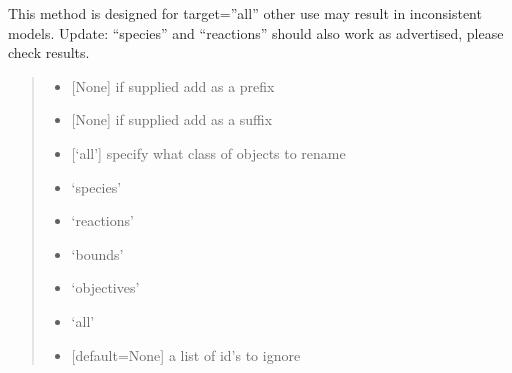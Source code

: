 \documentclass[letterpaper,10pt,english]{sphinxmanual}
\begin{document}
\begin{fulllineitems}
\begin{fulllineitems}
\label{\detokenize{modules_doc:cbmpy.CBModel.Model.renameObjectIds}}
\pysigstartsignatures
{}
\pysigstopsignatures
\sphinxAtStartPar
This method is designed for target=”all” other use may result in inconsistent models. Update: “species” and “reactions”
should also work as advertised, please check results.
\begin{quote}
\begin{itemize}
\item {} 
\sphinxAtStartPar
{} {[}None{]} if supplied add as a prefix

\item {} 
\sphinxAtStartPar
{} {[}None{]} if supplied add as a suffix

\item {} 
\sphinxAtStartPar
{} {[}‘all’{]} specify what class of objects to rename

\end{itemize}
\begin{itemize}
\item {} 
\sphinxAtStartPar
‘species’

\item {} 
\sphinxAtStartPar
‘reactions’

\item {} 
\sphinxAtStartPar
‘bounds’

\item {} 
\sphinxAtStartPar
‘objectives’

\item {} 
\sphinxAtStartPar
‘all’

\end{itemize}
\begin{itemize}
\item {} 
\sphinxAtStartPar
{} {[}default=None{]} a list of id’s to ignore

\end{itemize}
\end{quote}


\end{fulllineitems}
\end{fulllineitems}
\end{document}

